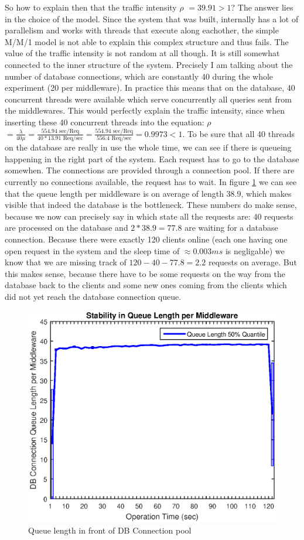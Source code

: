 \documentclass[11pt]{article}
\begin{document}
So how to explain then that the traffic intensity $\rho$ $=39.91>1$? The answer lies in the choice of the model. Since the system that was built, internally has a lot of parallelism and works with threads that execute along eachother, the simple M/M/1 model is not able to explain this complex structure and thus fails. The value of the traffic intensity is not random at all though. It is still somewhat connected to the inner structure of the system. Precisely I am talking about the number of database connections, which are constantly 40 during the whole experiment (20 per middleware). In practice this means that on the database, 40 concurrent threads were available which serve concurrently all queries sent from the middlewares. This would perfectly explain the traffic intensity, since when inserting these 40 concurrent threads into the equation: $\rho$ $=\frac{\lambda}{40\mu}=\frac{554.94 \text{ sec/Req}}{40*13.91\text{ Req/sec}}=\frac{554.94 \text{ sec/Req}}{556.4 \text{ Req/sec}}=0.9973<1$. To be sure that all 40 threads on the database are really in use the whole time, we can see if there is queueing happening in the right part of the system. Each request has to go to the database somewhen. The connections are provided through a connection pool. If there are currently no connections available, the request has to wait. In figure \ref{fig:queue_length} we can see that the queue length per middleware is on average of length $38.9$, which makes visible that indeed the database is the bottleneck. These numbers do make sense, because we now can precisely say in which state all the requests are: 40 requests are processed on the database and $2*38.9=77.8$ are waiting for a database connection. Because there were exactly 120 clients online (each one having one open request in the system and the sleep time of $\approx0.003ms$ is negligable) we know that we are missing track of $120-40-77.8=2.2$ requests on average. But this makes sense, because there have to be some requests on the way from the database back to the clients and some new ones coming from the clients which did not yet reach the database connection queue.
\begin{figure}
\centering
\includegraphics[width=0.5\linewidth]{figures/stability_2/queue_length}
\caption{Queue length in front of DB Connection pool}
\label{fig:queue_length}
\end{figure}
\end{document}
